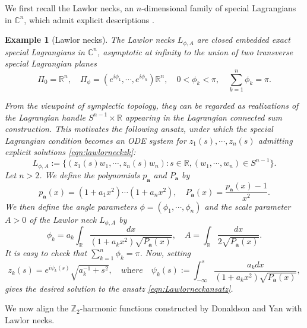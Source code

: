 \documentclass[11pt,a4paper]{article}
\numberwithin{equation}{section}%
\newtheorem{eg}[thm]{Example}
\theoremstyle{definition}
\newcommand{\R}{\mathbb{R}}
\newcommand{\bma}{\boldsymbol{a}}
\newcommand{\C}{\mathbb{C}}
\newcommand{\Z}{\mathbb{Z}}
\begin{document}
We first recall the Lawlor necks, an $n$-dimensional family of special Lagrangians in $\C^n$, which admit explicit descriptions \cite{Lawlor,harvey1990spinors}. 
\begin{eg}[Lawlor necks] \label{eg:Lawlor}
    The Lawlor necks $L_{\phi,A}$ are closed embedded exact special Lagrangians in $\C^n$, asymptotic at infinity to the union of two transverse special Lagrangian planes
    \[
        \Pi_0=\R^n,\quad
        \Pi_\phi=(e^{i\phi_1},\cdots,e^{i\phi_n})\R^n,\quad
        0<\phi_k<\pi,\quad
        \sum_{k=1}^n\phi_k=\pi.
    \]

    From the viewpoint of symplectic topology, they can be regarded as realizations of the Lagrangian handle $S^{n-1}\times \R$ appearing in the Lagrangian connected sum construction. This motivates the following ansatz, under which the special Lagrangian condition becomes an ODE system for $z_1(s),\cdots,z_n(s)$ admitting explicit solutions \eqref{eqn:lawlorneckzk}:
    \begin{equation}
        \label{eqn:Lawlorneckansatz}
        L_{\phi,A}:=
        \{(z_1(s)w_1,\cdots,z_n(s)w_n):s\in \R,(w_1,\cdots,w_n)\in S^{n-1}\}.
    \end{equation}
    Let $n>2$. We define the polynomials $p_{\bma}$ and $P_{\bma}$ by
    \[
        p_{\bma}(x)=(1+a_1x^2)\cdots (1+a_nx^2),
        \quad
        P_{\bma}(x)=\frac{p_{\bma}(x)-1}{x^2}.
    \]
    We then define the angle parameters $\phi=(\phi_1,\cdots,\phi_n)$ and the scale parameter $A>0$ of the Lawlor neck $L_{\phi,A}$ by
    \begin{equation}
        \label{eqn:def-lawlor-data}
        \phi_k=a_k\int_{\R}\frac{dx}{(1+a_kx^2)\sqrt{{P_{\bma}(x)}}},
        \quad
        A=\int_\R \frac{dx}{2\sqrt{P_{\bma}(x)}}.
    \end{equation}
    It is easy to check that $\sum\limits_{k=1}^n\phi_k=\pi$. Now, setting
    \begin{equation}
        \label{eqn:lawlorneckzk}
        z_k(s)=e^{i\psi_k(s)}\sqrt{a_k^{-1}+s^2},
        \quad
        \textit{where}\quad
        \psi_k(s):=\int_{-\infty}^s
        \frac{a_kdx}{(1+a_kx^2)\sqrt{P_{{\bma}}(x)}},
    \end{equation}
    gives the desired solution to the ansatz \eqref{eqn:Lawlorneckansatz}.
\end{eg}

We now align the $\Z_2$-harmonic functions  constructed by Donaldson \cite{Donaldson-Twistor} and Yan \cite{Yan-Construction} with Lawlor necks. 
\end{document}
